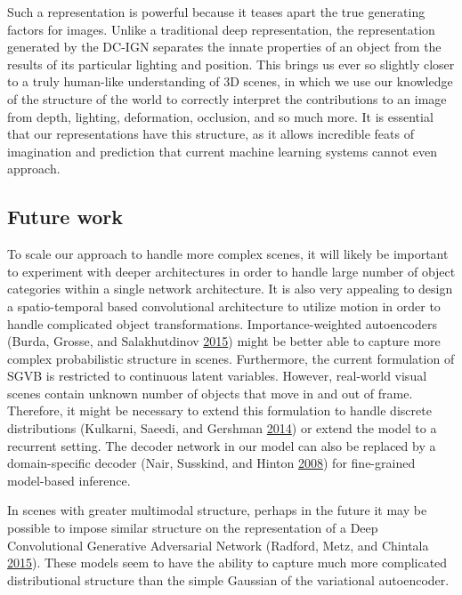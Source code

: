 \documentclass[12pt,twoside]{mitthesis}
\begin{document}
Such a representation is powerful because it teases apart the true
generating factors for images. Unlike a traditional deep representation,
the representation generated by the DC-IGN separates the innate
properties of an object from the results of its particular lighting and
position. This brings us ever so slightly closer to a truly human-like
understanding of 3D scenes, in which we use our knowledge of the
structure of the world to correctly interpret the contributions to an
image from depth, lighting, deformation, occlusion, and so much more. It
is essential that our representations have this structure, as it allows
incredible feats of imagination and prediction that current machine
learning systems cannot even approach.

\subsection{Future work}\label{future-work}

To scale our approach to handle more complex scenes, it will likely be
important to experiment with deeper architectures in order to handle
large number of object categories within a single network architecture.
It is also very appealing to design a spatio-temporal based
convolutional architecture to utilize motion in order to handle
complicated object transformations. Importance-weighted autoencoders
(Burda, Grosse, and Salakhutdinov
\protect\hyperlink{ref-burda2015importance}{2015}) might be better able
to capture more complex probabilistic structure in scenes. Furthermore,
the current formulation of SGVB is restricted to continuous latent
variables. However, real-world visual scenes contain unknown number of
objects that move in and out of frame. Therefore, it might be necessary
to extend this formulation to handle discrete distributions (Kulkarni,
Saeedi, and Gershman
\protect\hyperlink{ref-kulkarni2014variational}{2014}) or extend the
model to a recurrent setting. The decoder network in our model can also
be replaced by a domain-specific decoder (Nair, Susskind, and Hinton
\protect\hyperlink{ref-nair2008analysis}{2008}) for fine-grained
model-based inference.

In scenes with greater multimodal structure, perhaps in the future it
may be possible to impose similar structure on the representation of a
Deep Convolutional Generative Adversarial Network (Radford, Metz, and
Chintala \protect\hyperlink{ref-radford2015unsupervised}{2015}). These
models seem to have the ability to capture much more complicated
distributional structure than the simple Gaussian of the variational
autoencoder.
\end{document}
